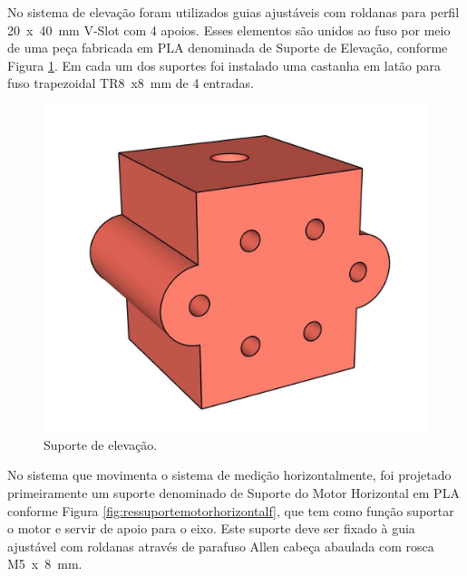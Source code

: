 \pagebreak

No sistema de elevação foram utilizados guias ajustáveis com roldanas para perfil 20~x~40~mm V-Slot 
com 4 apoios. Esses elementos são unidos ao fuso por meio de uma peça fabricada em \ac{PLA} 
denominada de Suporte de Elevação, conforme Figura \ref{fig:ressuporteelevacao}. Em cada um dos 
suportes foi instalado uma castanha em latão para fuso trapezoidal TR8~x8~mm de 4 entradas.

\begin{figure}[H]
\centering
\caption{Suporte de elevação.}\label{fig:ressuporteelevacao}
\includegraphics[scale = 0.4]{figuras/ressuporteelevacao}
\end{figure}
        
\pagebreak

No sistema que movimenta o sistema de medição horizontalmente, foi projetado primeiramente 
um suporte denominado de Suporte do Motor Horizontal em \ac{PLA} conforme Figura \ref{fig:ressuportemotorhorizontalf}, 
que tem como função suportar o motor e servir de apoio para o eixo. Este suporte deve ser fixado 
à guia ajustável com roldanas através de parafuso Allen cabeça abaulada com rosca M5~x~8~mm.

